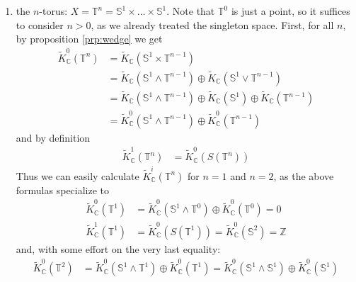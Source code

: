 \begin{exa}
\begin{enumerate}
Using the factorization \ref{prp:factor}, it is clear that
\begin{align*}
  K_{\mathbb{C}}^{0}(\mathbb{S}^{1})
  &=
  \mathbb{Z}
\end{align*}
at least.
\item
  the $n$-torus: $X = \mathbb{T}^{n} = \mathbb{S}^{1} \times \ldots \times \mathbb{S}^{1}$.
Note that $\mathbb{T}^{0}$ is just a point, so it suffices to consider $n > 0$, as we already treated the singleton space.
First, for all $n$, by proposition \ref{prp:wedge} we get
\begin{align*}
  \tilde{K}_{\mathbb{C}}^{0}(\mathbb{T}^{n})
  &=
  \tilde{K}_{\mathbb{C}}(\mathbb{S}^{1} \times \mathbb{T}^{n-1})
  \\
  &=
  \tilde{K}_{\mathbb{C}}(\mathbb{S}^{1} \wedge \mathbb{T}^{n-1})
  \oplus
  \tilde{K}_{\mathbb{C}}(\mathbb{S}^{1} \vee \mathbb{T}^{n-1})
  \\
  &=
  \tilde{K}_{\mathbb{C}}(\mathbb{S}^{1} \wedge \mathbb{T}^{n-1})
  \oplus
  \tilde{K}_{\mathbb{C}}(\mathbb{S}^{1})
  \oplus
  \tilde{K}_{\mathbb{C}}(\mathbb{T}^{n-1})
  \\
  &=
  \tilde{K}_{\mathbb{C}}^{0}(\mathbb{S}^{1} \wedge \mathbb{T}^{n-1})
  \oplus
  \tilde{K}_{\mathbb{C}}^{0}(\mathbb{T}^{n-1})
\end{align*}
and by definition
\begin{align*}
  \tilde{K}_{\mathbb{C}}^{1}(\mathbb{T}^{n})
  &=
  \tilde{K}_{\mathbb{C}}^{0}(S(\mathbb{T}^{n}))
\end{align*}
Thus we can easily calculate $\tilde{K}_{\mathbb{C}}^{i}(\mathbb{T}^{n})$ for $n = 1$ and $n = 2$, as the above formulas specialize to
\begin{align*}
  \tilde{K}_{\mathbb{C}}^{0}(\mathbb{T}^{1})
  &=
  \tilde{K}_{\mathbb{C}}^{0}(\mathbb{S}^{1} \wedge \mathbb{T}^{0})
  \oplus
  \tilde{K}_{\mathbb{C}}^{0}(\mathbb{T}^{0})
  =
  0
  \\
  \tilde{K}_{\mathbb{C}}^{1}(\mathbb{T}^{1})
  &=
  \tilde{K}_{\mathbb{C}}^{0}(S(\mathbb{T}^{1}))
  =
  \tilde{K}_{\mathbb{C}}^{0}(\mathbb{S}^{2})
  =
  \mathbb{Z}
\end{align*}
and, with some effort on the very last equality:
\begin{align*}
  \tilde{K}_{\mathbb{C}}^{0}(\mathbb{T}^{2})
  &=
  \tilde{K}_{\mathbb{C}}^{0}(\mathbb{S}^{1} \wedge \mathbb{T}^{1})
  \oplus
  \tilde{K}_{\mathbb{C}}^{0}(\mathbb{T}^{1})
  =
  \tilde{K}_{\mathbb{C}}^{0}(\mathbb{S}^{1} \wedge \mathbb{S}^{1})
  \oplus
  \tilde{K}_{\mathbb{C}}^{0}(\mathbb{S}^{1})

\end{align*}
\end{enumerate}
\end{exa}
